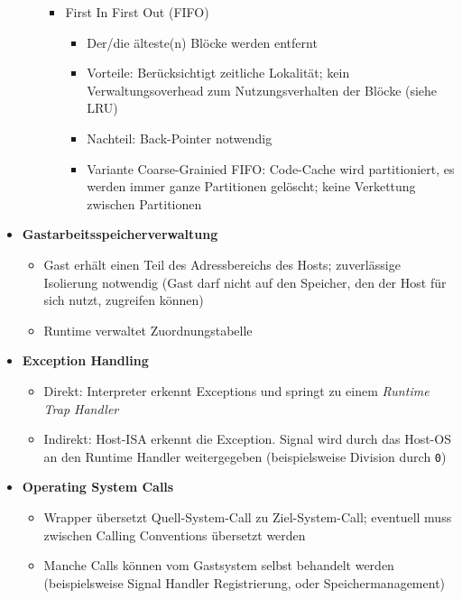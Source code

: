\begin{itemize}
\begin{itemize}
\begin{itemize}
			\item First In First Out (FIFO)
			\begin{itemize}
				\item Der/die älteste(n) Blöcke werden entfernt
				\item Vorteile: Berücksichtigt zeitliche Lokalität; kein Verwaltungsoverhead zum Nutzungsverhalten der Blöcke (siehe LRU)
				\item Nachteil: Back-Pointer notwendig
				\item Variante Coarse-Grainied FIFO: Code-Cache wird partitioniert, es werden immer ganze Partitionen gelöscht; keine Verkettung zwischen Partitionen
			\end{itemize}
		\end{itemize}
	\end{itemize}
	\item \textbf{Gastarbeitsspeicherverwaltung}
	\begin{itemize}
		\item Gast erhält einen Teil des Adressbereichs des Hosts; zuverlässige Isolierung notwendig (Gast darf nicht auf den Speicher, den der Host für sich nutzt, zugreifen können)
		\item Runtime verwaltet Zuordnungstabelle
	\end{itemize}
	\item \textbf{Exception Handling}
	\begin{itemize}
		\item Direkt: Interpreter erkennt Exceptions und springt zu einem \textit{Runtime Trap Handler}
		\item Indirekt: Host-ISA erkennt die Exception. Signal wird durch das Host-OS an den Runtime Handler weitergegeben (beispielsweise Division durch \texttt{0})
	\end{itemize}
	\item \textbf{Operating System Calls}
	\begin{itemize}
		\item Wrapper übersetzt Quell-System-Call zu Ziel-System-Call; eventuell muss zwischen Calling Conventions übersetzt werden
		\item Manche Calls können vom Gastsystem selbst behandelt werden (beispielsweise Signal Handler Registrierung, oder Speichermanagement)
	\end{itemize}
\end{itemize}




